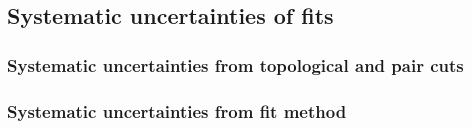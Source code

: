\subsection{Systematic uncertainties of fits}
\label{sec:SysErrorsFits}

\subsubsection{Systematic uncertainties from topological and pair cuts}
\label{sec:SysErrorsFitsCuts}

\subsubsection{Systematic uncertainties from fit method}
\label{sec:SysErrorsFitsMethod}